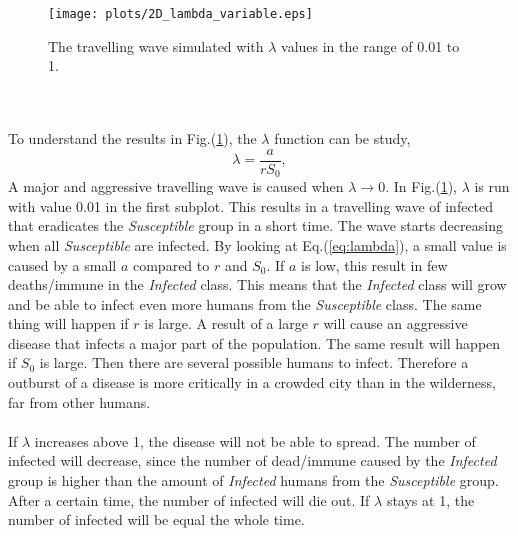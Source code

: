 \documentclass[%
twoside,                 %
final,                   %
10pt]{article}
\begin{document}
\begin{figure}[ht]
  \centerline{\texttt{[image: plots/2D\_lambda\_variable.eps]}}
  \caption{
  \label{fig:change_lambda} The travelling wave simulated with $\lambda$ values in the range of 0.01 to 1.
  }
\end{figure}


\\
\\
To understand the results in Fig.(\ref{fig:change_lambda}), the $\lambda $ function can be study,
\begin{equation} \label{eq:lambda}
 \lambda =\frac{a}{rS_0},
\end{equation}
A major and aggressive travelling wave is caused when $\lambda \rightarrow 0$. In Fig.(\ref{fig:change_lambda}), $\lambda$ is run with value 0.01 in the first subplot. This results in a travelling wave of infected that eradicates the \emph{Susceptible} group in a short time. The wave starts decreasing when all \emph{Susceptible} are infected. By looking at Eq.(\ref{eq:lambda}), a small value is caused by a small $a$ compared to $r$ and $S_0$. If $a$ is low, this result in few deaths/immune in the \emph{Infected} class. This means that the \emph{Infected} class will grow and be able to infect even more humans from the \emph{Susceptible} class. The same thing will happen if $r$ is large. A result of a large $r$ will cause an aggressive disease that infects  a major part of the population. The same result will happen if $S_0$ is large. Then there are several possible humans to infect. Therefore a outburst of a disease is more critically in a crowded city than in the wilderness, far from other humans.
\\
\\
If $\lambda$ increases above 1, the disease will not be able to spread. The number of infected will decrease, since the number of dead/immune caused by the \emph{Infected} group is higher than the amount of \emph{Infected} humans from the \emph{Susceptible} group. After a certain time, the number of infected will die out. If $\lambda$ stays at 1, the number of infected will be equal the whole time. 
\end{document}
